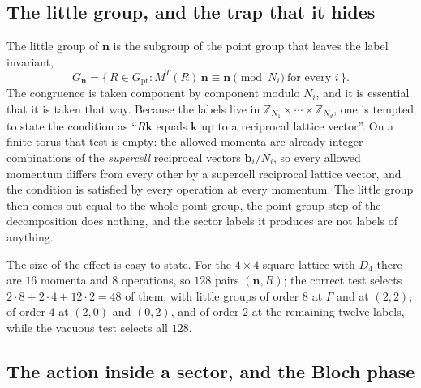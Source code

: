 \documentclass[12pt]{article}
\newcommand{\Gpt}{G_{\mathrm{pt}}}
\newcommand{\Gk}{G_{\mathbf{n}}}
\begin{document}
\subsection{The little group, and the trap that it hides}

The little group of $\mathbf{n}$ is the subgroup of the point group that leaves
the label invariant,
\begin{equation}
  \Gk = \{\,R \in \Gpt : M^{T}(R)\,\mathbf{n} \equiv \mathbf{n}
  \pmod{N_i}\ \text{for every } i\,\}.
  \label{eq:little}
\end{equation}
The congruence is taken component by component modulo $N_i$, and it is essential
that it is taken that way. Because the labels live in
$\mathbb{Z}_{N_1}\times\cdots\times\mathbb{Z}_{N_d}$, one is tempted to state the
condition as ``$R\mathbf{k}$ equals $\mathbf{k}$ up to a reciprocal lattice
vector''. On a finite torus that test is empty: the allowed momenta are already
integer combinations of the \emph{supercell} reciprocal vectors
$\mathbf{b}_i/N_i$, so every allowed momentum differs from every other by a
supercell reciprocal lattice vector, and the condition is satisfied by every
operation at every momentum. The little group then comes out equal to the whole
point group, the point-group step of the decomposition does nothing, and the
sector labels it produces are not labels of anything.

The size of the effect is easy to state. For the $4\times4$ square lattice with
$D_4$ there are $16$ momenta and $8$ operations, so $128$ pairs $(\mathbf{n},R)$;
the correct test selects $2\cdot 8 + 2\cdot 4 + 12\cdot 2 = 48$ of them, with
little groups of order $8$ at $\Gamma$ and at $(2,2)$, of order $4$ at $(2,0)$
and $(0,2)$, and of order $2$ at the remaining twelve labels, while the vacuous
test selects all $128$.

\subsection{The action inside a sector, and the Bloch phase}
\end{document}
